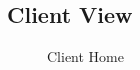 \subsection{Client View} \label{client_view}
\begin{figure}[H]
	\begin{center}
		\caption{Client Home}
	\end{center}
\end{figure}
\newpage
